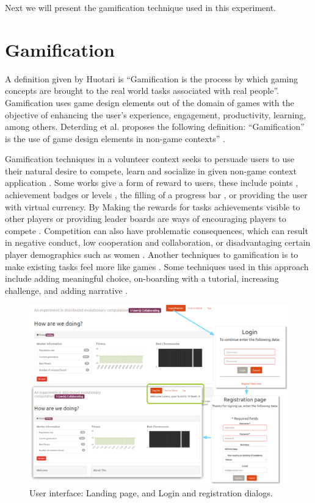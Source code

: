 \documentclass{llncs}
\begin{document}
Next we will present the gamification technique used in this experiment. 

\section{Gamification}
\label{sec:gamification}
A definition given by Huotari  \cite{huotari2012defining} is ``Gamification is
the process by which gaming concepts are brought to the real world tasks associated with
real people''. Gamification uses game design elements out of the domain of games 
with the objective of enhancing the user's experience, engagement, productivity, 
learning, among others. Deterding et al. proposes the following definition:
 ``Gamification” is the use of game design elements in non-game contexts'' 
 \cite{deterding2011gamification}.

Gamification techniques in a volunteer context seeks to persuade 
users to use their natural desire to compete, learn and socialize in 
given non-game context application \cite{deterding2011game,hamari2014does}.  
Some works give a form of reward to users, these include 
points \cite{sutter2010browse}, achievement badges or levels \cite{hamari2011framework}, 
the filling of a progress bar \cite{o2010get}, or providing the user with virtual currency.
By Making the rewards for  tasks achievements visible to other players or 
providing leader boards are ways of encouraging players to compete \cite{hickman2010total}. 
Competition can also have problematic consequences, which can result in
negative conduct, low cooperation and collaboration, or disadvantaging certain player demographics
such as women \cite{kumar2013gamification}. Another techniques to gamification 
is to make existing tasks feel more like games \cite{deterding2010just}. 
Some techniques used in this approach include adding meaningful choice, 
on-boarding with a tutorial, increasing challenge, and adding narrative \cite{mcgonigal2011reality}.

\begin{figure}[htb]
    \centering
        \includegraphics[width=5in]{img/login.png}
    \caption{ User interface: Landing page, and Login and registration dialogs.  
    }
    \label{fig:login}
\end{figure}
\end{document}
